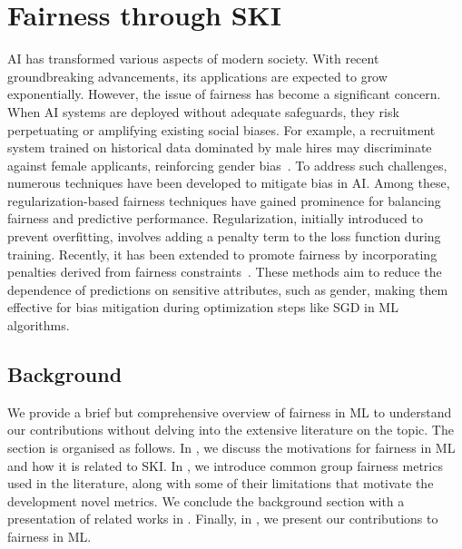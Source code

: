 
\chapter[Fairness through SKI]{Fairness through \gls{SKI}}
\label{ch:fairness-through-ski}
\minitoc

\Gls{AI} has transformed various aspects of modern society.
%
With recent groundbreaking advancements, its applications are expected to grow exponentially.
%
However, the issue of fairness has become a significant concern.
%
When \gls{AI} systems are deployed without adequate safeguards, they risk perpetuating or amplifying existing social biases.
%
For example, a recruitment system trained on historical data dominated by male hires may discriminate against female applicants, reinforcing gender bias~\cite{kochling2020discriminated}.
%
To address such challenges, numerous techniques have been developed to mitigate bias in \gls{AI}.
%
Among these, regularization-based fairness techniques have gained prominence for balancing fairness and predictive performance.
%
Regularization, initially introduced to prevent overfitting, involves adding a penalty term to the loss function during training.
%
Recently, it has been extended to promote fairness by incorporating penalties derived from fairness constraints~\cite{DBLP:conf/icdm/KamishimaAS11}.
%
These methods aim to reduce the dependence of predictions on sensitive attributes, such as gender, making them effective for bias mitigation during optimization steps like \gls{SGD} in \gls{ML} algorithms.
%

\section{Background}\label{sec:fairness-background}
%
We provide a brief but comprehensive overview of fairness in \gls{ML} to understand our contributions without delving into the extensive literature on the topic.
%
The section is organised as follows.
%
In , we discuss the motivations for fairness in \gls{ML} and how it is related to \gls{SKI}.
%
In , we introduce common group fairness metrics used in the literature, along with some of their limitations that motivate the development novel metrics.
%
We conclude the background section with a presentation of related works in .
%
Finally, in , we present our contributions to fairness in \gls{ML}.


